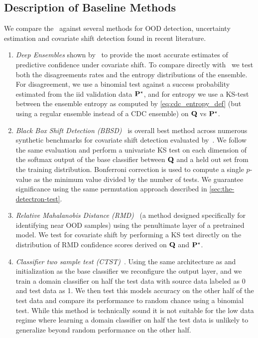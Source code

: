 \subsection{Description of Baseline Methods}
\label{subsec:baselines}
We compare the \method\ against several methods for OOD detection, uncertainty estimation and covariate shift detection found in recent literature.
\begin{enumerate}
    \item \textit{Deep Ensembles} shown by~\cite{trustuncert} to provide the most accurate estimates of predictive confidence under covariate shift.
    To compare directly with \method\ we test both the disagreements rates and the entropy distributions of the ensemble.
    For disagreement, we use a binomial test against a success probability estimated from the iid validation data $\mathbf{P}^\star$, and for entropy we use a KS-test between
    the ensemble entropy as computed by \autoref{eq:cdc_entropy_def} (but using a regular ensemble instead of a CDC ensemble) on $\mathbf{Q}$ vs $\mathbf{P}^\star$.
    \item \textit{Black Box Shift Detection (BBSD)}~\citep{bbsd} is overall best method across numerous synthetic benchmarks for covariate shift detection evaluated by~\citeauthor{failloud}.
    We follow the same evaluation and perform a univariate KS test on each dimension of the softmax output of the base classifier between $\mathbf{Q}$ and a held out set from the training distribution.
    Bonferroni correction is used to compute a single $p$-value as the minimum value divided by the number of tests.
    We guarantee significance using the same permutation approach described in \autoref{sec:the-detectron-test}.
    \item \textit{Relative Mahalanobis Distance (RMD)}~\citep{relmahala} (a method designed specifically for identifying near OOD samples) using the penultimate layer of a pretrained model.
    We test for covariate shift by performing a KS test directly on the distribution of RMD confidence scores derived on $\mathbf{Q}$ and $\mathbf{P}^\star$.
    \item \textit{Classifier two sample test (CTST)}~\citep{paz2017revisiting}.
    Using the same architecture as and initialization as the base classifier we reconfigure the output layer, and we train
    a domain classifier on half the test data with source data labeled as 0 and test data as 1.
    We then test this models accuracy on the other half of the test data and compare its performance to random chance using a binomial test.
    While this method is technically sound it is not suitable for the low data regime where learning a domain classifier on half the test data is unlikely to generalize beyond random performance on the other half.

\end{enumerate}
